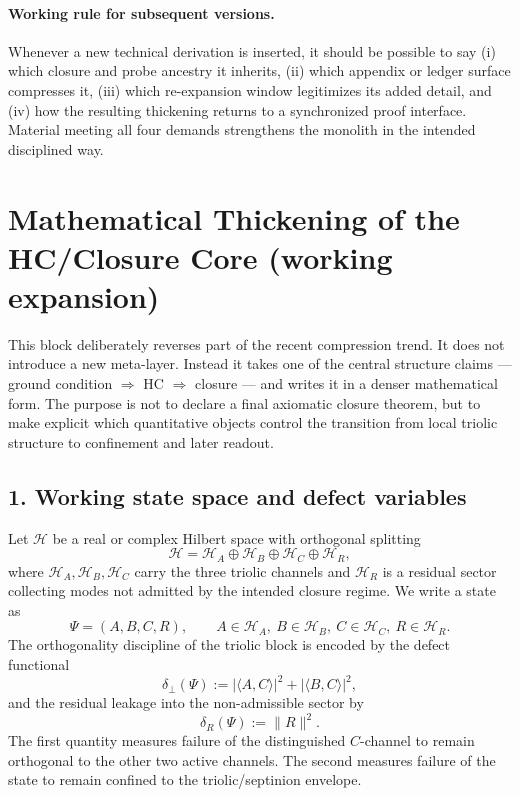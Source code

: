 \paragraph{Working rule for subsequent versions.}
Whenever a new technical derivation is inserted, it should be possible to say
(i) which closure and probe ancestry it inherits, (ii) which appendix or ledger
surface compresses it, (iii) which re-expansion window legitimizes its added
detail, and (iv) how the resulting thickening returns to a synchronized proof
interface. Material meeting all four demands strengthens the monolith in the
intended disciplined way.


\clearpage
\section*{Mathematical Thickening of the HC/Closure Core (working expansion)}

This block deliberately reverses part of the recent compression trend. It does
not introduce a new meta-layer. Instead it takes one of the central structure
claims --- ground condition $\Rightarrow$ HC $\Rightarrow$ closure --- and writes it
in a denser mathematical form. The purpose is not to declare a final axiomatic
closure theorem, but to make explicit which quantitative objects control the
transition from local triolic structure to confinement and later readout.

\subsection*{1. Working state space and defect variables}
Let $\mathcal H$ be a real or complex Hilbert space with orthogonal splitting
\[
\mathcal H = \mathcal H_A \oplus \mathcal H_B \oplus \mathcal H_C \oplus \mathcal H_R,
\]
where $\mathcal H_A,\mathcal H_B,\mathcal H_C$ carry the three triolic channels and
$\mathcal H_R$ is a residual sector collecting modes not admitted by the intended
closure regime. We write a state as
\[
\Psi = (A,B,C,R), \qquad A\in\mathcal H_A,\ B\in\mathcal H_B,\ C\in\mathcal H_C,
\ R\in\mathcal H_R.
\]
The orthogonality discipline of the triolic block is encoded by the defect
functional
\[
\delta_{\perp}(\Psi)
:= |\langle A,C\rangle|^2 + |\langle B,C\rangle|^2,
\]
and the residual leakage into the non-admissible sector by
\[
\delta_R(\Psi) := \|R\|^2.
\]
The first quantity measures failure of the distinguished $C$-channel to remain
orthogonal to the other two active channels. The second measures failure of the
state to remain confined to the triolic/septinion envelope.

